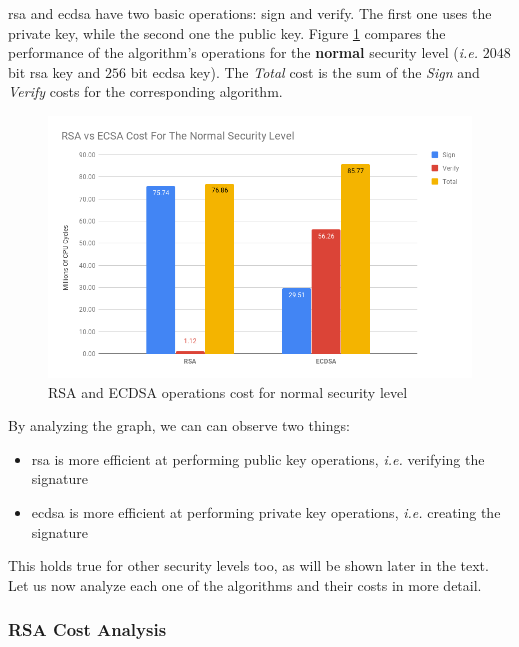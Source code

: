 \gls{rsa} and \gls{ecdsa} have two basic operations: sign and verify. The first one uses the private key, while the
second one the public key. Figure \ref{fig:rsa-ecdsa-sign-ver-total-normal-sl} compares the performance of the algorithm's
operations for the \textbf{normal} security level (\textit{i.e.} $2048$ bit \gls{rsa} key and $256$ bit \gls{ecdsa} key).
The \textit{Total} cost is the sum of the \textit{Sign} and \textit{Verify} costs for the corresponding algorithm.

\begin{figure}
  \centering
  \includegraphics[width=1.0\textwidth]{img/rsa_ecdsa_cost_normal_sl.png}
  \centering \caption{\label{fig:rsa-ecdsa-sign-ver-total-normal-sl} RSA and ECDSA operations cost for normal security level}
\end{figure}

By analyzing the graph, we can can observe two things:

\begin{itemize}
  \item \gls{rsa} is more efficient at performing public key operations, \textit{i.e.} verifying the signature
  \item \gls{ecdsa} is more efficient at performing private key operations, \textit{i.e.} creating the signature
\end{itemize}

This holds true for other security levels too, as will be shown later in the text. Let us now analyze each one
of the algorithms and their costs in more detail.

\subsubsection{RSA Cost Analysis}

